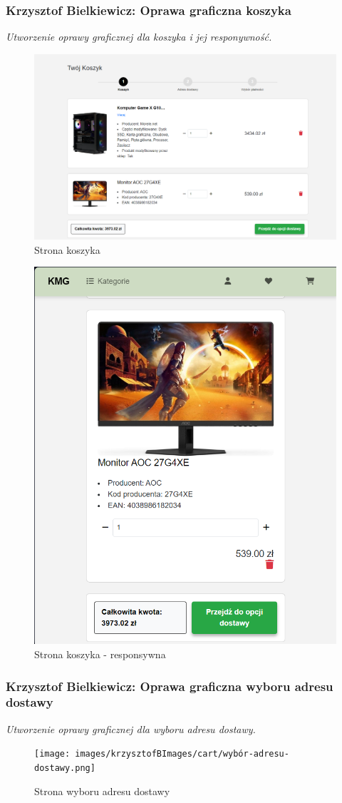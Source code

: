 \documentclass[12pt,a4paper,oneside]{article}
\theoremstyle{definition}
\numberwithin{equation}{section}
\begin{document}
\subsubsection{Krzysztof Bielkiewicz: Oprawa graficzna koszyka}
\label{1.3.8}
\textit{Utworzenie oprawy graficznej dla koszyka i jej responywność.}
\begin{figure}[H]
    \centering
    \includegraphics[width=0.8\columnwidth]{images/krzysztofBImages/cart/cart-step1.png}
    \caption{Strona koszyka}
\end{figure}

\begin{figure}[H]
    \centering
    \includegraphics[width=0.5\columnwidth]{images/krzysztofBImages/cart/cart-step1-respo.png}
    \caption{Strona koszyka - responsywna}
\end{figure}

\subsubsection{Krzysztof Bielkiewicz: Oprawa graficzna wyboru adresu dostawy}
\label{1.3.9}
\textit{Utworzenie oprawy graficznej dla wyboru adresu dostawy.}
\begin{figure}[H]
    \centering
    \texttt{[image: images/krzysztofBImages/cart/wybór-adresu-dostawy.png]}
    \caption{Strona wyboru adresu dostawy}
\end{figure}
\end{document}
